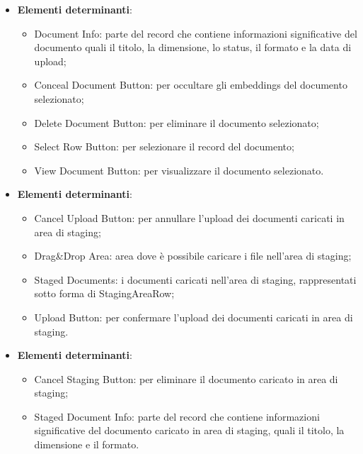 \documentclass[10pt, a4paper]{article}
\begin{document}
\label{DocumentsListRowDettaglio}
\begin{itemize}
    \item \textbf{Elementi determinanti}:
     \begin{itemize}
        \item Document Info: parte del record che contiene informazioni significative del documento quali il titolo, la dimensione, lo status, il formato e la data di upload;
        \item Conceal Document Button: per occultare gli embeddings del documento selezionato;
        \item Delete Document Button: per eliminare il documento selezionato;
        \item Select Row Button: per selezionare il record del documento;
        \item View Document Button: per visualizzare il documento selezionato.
    \end{itemize}
\end{itemize}

\label{StagingAreaDettaglio}
\begin{itemize}
    \item \textbf{Elementi determinanti}:
     \begin{itemize}
        \item Cancel Upload Button: per annullare l'upload dei documenti caricati in area di staging;
        \item Drag\&Drop Area: area dove è possibile caricare i file nell'area di staging;
        \item Staged Documents: i documenti caricati nell'area di staging, rappresentati sotto forma di StagingAreaRow;
        \item Upload Button: per confermare l'upload dei documenti caricati in area di staging.
    \end{itemize}
\end{itemize}

\label{StagingAreaRowDettaglio}
\begin{itemize}
    \item \textbf{Elementi determinanti}:
     \begin{itemize}
        \item Cancel Staging Button: per eliminare il documento caricato in area di staging;
        \item Staged Document Info: parte del record che contiene informazioni significative del documento caricato in area di staging, quali il titolo, la dimensione e il formato.
    \end{itemize}
\end{itemize}
\end{document}
